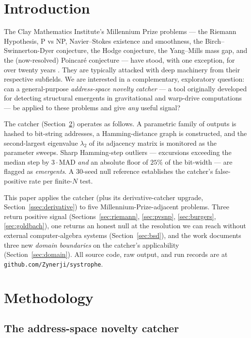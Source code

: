 \documentclass[11pt,letterpaper]{article}
\newcommand{\Systrophe}{Systroph\=e}
\begin{document}
\section{Introduction}\label{sec:intro}

The Clay Mathematics Institute's Millennium Prize problems --- the Riemann Hypothesis, P vs NP, Navier--Stokes existence and smoothness, the Birch--Swinnerton-Dyer conjecture, the Hodge conjecture, the Yang--Mills mass gap, and the (now-resolved) Poincar\'e conjecture --- have stood, with one exception, for over twenty years \cite{clay}. They are typically attacked with deep machinery from their respective subfields. We are interested in a complementary, exploratory question: can a general-purpose \emph{address-space novelty catcher} --- a tool originally developed for detecting structural emergents in gravitational \cite{tipler1974, lewis_papapetrou} and warp-drive \cite{alcubierre, krasnikov} computations --- be applied to these problems and give \emph{any} useful signal?

The catcher (Section~\ref{sec:method}) operates as follows. A parametric family of outputs is hashed to bit-string addresses, a Hamming-distance graph is constructed, and the second-largest eigenvalue $\lambda_2$ of its adjacency matrix is monitored as the parameter sweeps. Sharp Hamming-step outliers --- excursions exceeding the median step by $3 \cdot \mathrm{MAD}$ \emph{and} an absolute floor of $25\%$ of the bit-width --- are flagged as \emph{emergents}. A 30-seed null reference \cite[\Systrophe{} v0.19.1]{systrophe_repo} establishes the catcher's false-positive rate per finite-$N$ test.

This paper applies the catcher (plus its derivative-catcher upgrade, Section~\ref{ssec:derivative}) to five Millennium-Prize-adjacent problems. Three return positive signal (Sections~\ref{sec:riemann}, \ref{sec:pvsnp}, \ref{sec:burgers}, \ref{sec:goldbach}), one returns an honest null at the resolution we can reach without external computer-algebra systems (Section~\ref{sec:bsd}), and the work documents three new \emph{domain boundaries} on the catcher's applicability (Section~\ref{sec:domain}). All source code, raw output, and run records are at \texttt{github.com/Zynerji/systrophe}.

\section{Methodology}\label{sec:method}

\subsection{The address-space novelty catcher}\label{ssec:catcher}
\end{document}
